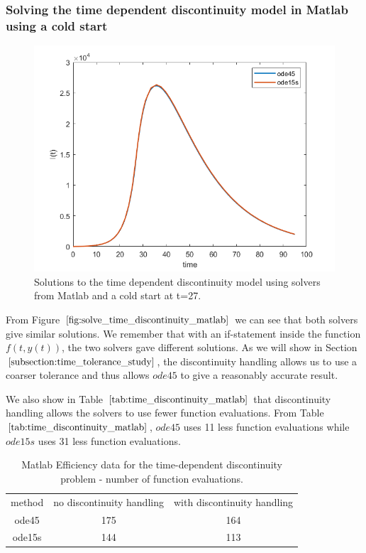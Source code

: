 \subsubsection{Solving the time dependent discontinuity model in Matlab using a cold start}
\begin{figure}[H]
\centering
\includegraphics[width=0.7\linewidth]{./figures/solve_time_discontinuity_matlab}
\caption{Solutions to the time dependent discontinuity model using solvers from Matlab and a cold start at t=27.}
\label{fig:solve_time_discontinuity_matlab}
\end{figure}

From Figure $\ref{fig:solve_time_discontinuity_matlab}$ we can see that both solvers give similar solutions. We remember that with an if-statement inside the function $f(t, y(t))$, the two solvers gave different solutions. As we will show in Section $\ref{subsection:time_tolerance_study}$, the discontinuity handling allows us to use a coarser tolerance and thus allows $ode45$ to give a reasonably accurate result.

We also show in Table $\ref{tab:time_discontinuity_matlab}$ that discontinuity handling allows the solvers to use fewer function evaluations. From Table $\ref{tab:time_discontinuity_matlab}$, $ode45$ uses 11 less function evaluations while $ode15s$ uses 31 less function evaluations.

\begin{table}[H]
\caption {Matlab Efficiency data for the time-dependent discontinuity problem - number of function evaluations.} 
\label{tab:time_discontinuity_matlab} 
\begin{center}
\begin{tabular}{ c c c }
method & no discontinuity handling & with discontinuity handling \\ 
ode45 & 175 & 164 \\
ode15s & 144 & 113 \\
\end{tabular}
\end{center}
\end{table}


